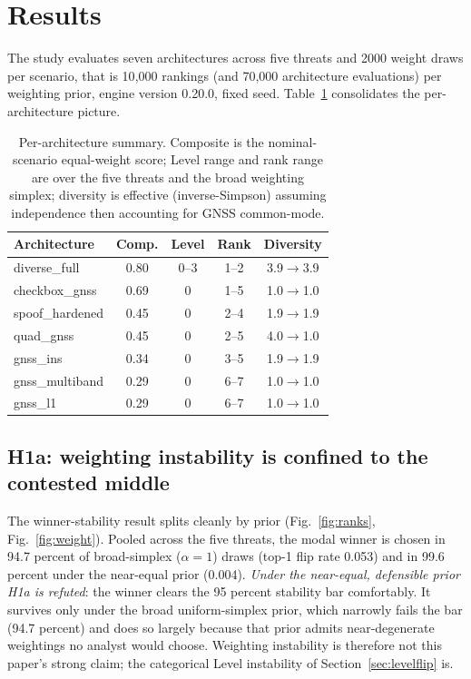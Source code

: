 \documentclass[conference]{IEEEtran}
\begin{document}
\section{Results}
\label{sec:results}
The study evaluates seven architectures across five threats and 2000 weight draws per scenario, that is 10{,}000 rankings (and 70{,}000 architecture evaluations) per weighting prior, engine version 0.20.0, fixed seed. Table~\ref{tab:summary} consolidates the per-architecture picture.

\begin{table}[t]
\caption{Per-architecture summary. Composite is the nominal-scenario equal-weight score; Level range and rank range are over the five threats and the broad weighting simplex; diversity is effective (inverse-Simpson) assuming independence then accounting for GNSS common-mode.}
\label{tab:summary}
\centering
\footnotesize
\begin{tabular}{lcccc}
\toprule
Architecture & Comp. & Level & Rank & Diversity \\
\midrule
diverse\_full   & 0.80 & 0--3 & 1--2 & 3.9$\rightarrow$3.9 \\
checkbox\_gnss  & 0.69 & 0    & 1--5 & 1.0$\rightarrow$1.0 \\
spoof\_hardened & 0.45 & 0    & 2--4 & 1.9$\rightarrow$1.9 \\
quad\_gnss      & 0.45 & 0    & 2--5 & 4.0$\rightarrow$1.0 \\
gnss\_ins       & 0.34 & 0    & 3--5 & 1.9$\rightarrow$1.9 \\
gnss\_multiband & 0.29 & 0    & 6--7 & 1.0$\rightarrow$1.0 \\
gnss\_l1        & 0.29 & 0    & 6--7 & 1.0$\rightarrow$1.0 \\
\bottomrule
\end{tabular}
\end{table}

\subsection{H1a: weighting instability is confined to the contested middle}
The winner-stability result splits cleanly by prior (Fig.~\ref{fig:ranks}, Fig.~\ref{fig:weight}). Pooled across the five threats, the modal winner is chosen in 94.7 percent of broad-simplex ($\alpha=1$) draws (top-1 flip rate 0.053) and in 99.6 percent under the near-equal prior (0.004). \emph{Under the near-equal, defensible prior H1a is refuted}: the winner clears the 95 percent stability bar comfortably. It survives only under the broad uniform-simplex prior, which narrowly fails the bar (94.7 percent) and does so largely because that prior admits near-degenerate weightings no analyst would choose. Weighting instability is therefore not this paper's strong claim; the categorical Level instability of Section~\ref{sec:levelflip} is.
\end{document}
